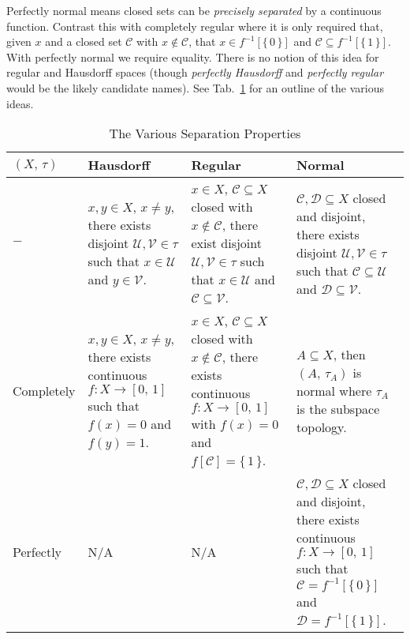 \documentclass{article}
\theoremstyle{plain}
\theoremstyle{normal}
\begin{document}
        Perfectly normal means closed sets can be
        \textit{precisely separated} by a continuous function. Contrast this
        with completely regular where it is only required that, given
        $x$ and a closed set $\mathcal{C}$ with $x\notin\mathcal{C}$, that
        $x\in{f}^{-1}[\{\,0\,\}]$ and
        $\mathcal{C}\subseteq{f}^{-1}[\{\,1\,\}]$. With perfectly normal we
        require equality. There is no notion of this idea for regular and
        Hausdorff spaces (though \textit{perfectly Hausdorff} and
        \textit{perfectly regular} would be the likely candidate names).
        See Tab.~\ref{tab:sep_props} for an outline of the various ideas.
        \begin{table}
            \centering
            \begin{tabularx}{\textwidth}{@{}| l | X | X | X |@{}}
                \hline
                $(X,\,\tau)$&\textbf{Hausdorff}&\textbf{Regular}&\textbf{Normal}\\
                \hline
                $-$&$x,y\in{X}$, $x\ne{y}$, there exists disjoint
                $\mathcal{U},\mathcal{V}\in\tau$ such that
                $x\in\mathcal{U}$ and $y\in\mathcal{V}$.
                &$x\in{X}$, $\mathcal{C}\subseteq{X}$ closed with
                $x\notin\mathcal{C}$, there exist disjoint
                $\mathcal{U},\mathcal{V}\in\tau$ such that $x\in\mathcal{U}$
                and $\mathcal{C}\subseteq\mathcal{V}$.&
                $\mathcal{C},\mathcal{D}\subseteq{X}$ closed and disjoint,
                there exists disjoint $\mathcal{U},\mathcal{V}\in\tau$ such
                that $\mathcal{C}\subseteq\mathcal{U}$ and
                $\mathcal{D}\subseteq\mathcal{V}$.\\
                \hline
                Completely&
                $x,y\in{X}$, $x\ne{y}$, there exists continuous
                $f:X\rightarrow[0,\,1]$ such that $f(x)=0$ and $f(y)=1$.
                &$x\in{X}$, $\mathcal{C}\subseteq{X}$ closed with
                $x\not\in\mathcal{C}$, there exists continuous
                $f:X\rightarrow[0,\,1]$ with $f(x)=0$ and
                $f[\mathcal{C}]=\{\,1\,\}$.
                &$A\subseteq{X}$, then $(A,\,\tau_{A})$ is normal where
                $\tau_{A}$ is the subspace topology.\\
                \hline
                Perfectly&N/A&N/A&
                $\mathcal{C},\mathcal{D}\subseteq{X}$ closed and disjoint,
                there exists continuous $f:X\rightarrow[0,\,1]$ such that
                $\mathcal{C}=f^{-1}[\{\,0\,\}]$ and
                $\mathcal{D}=f^{-1}[\{\,1\,\}]$.
                \\
                \hline
            \end{tabularx}
            \caption{The Various Separation Properties}
            \label{tab:sep_props}
        \end{table}
\end{document}
